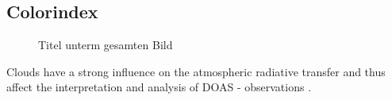 \documentclass  [
  paper    = a4,
  BCOR     = 10mm,
  twoside,
  fontsize = 12pt,
  fleqn,
  toc      = bibnumbered,
  toc      = listofnumbered,
  numbers  = noendperiod,
  headings = normal,
  listof   = leveldown,
  version  = 3.03
]                                       {scrreprt}
\begin{document}
	\subsection{Colorindex}
	\begin{figure}[h]		
		\caption{Titel unterm gesamten Bild}
		\label{fig:diffcolidx}
	\end{figure}
	Clouds  have  a  strong  influence  on  the  atmospheric  radiative  transfer  and  thus  affect  the  interpretation  and  analysis of DOAS - observations \cite{wagner2014cloud}.
	
\end{document}
